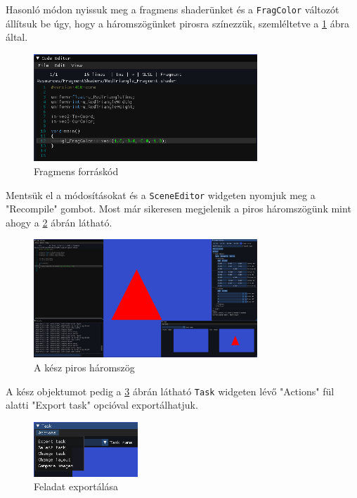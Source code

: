 Hasonló módon nyissuk meg a fragmens shaderünket és a \verb|FragColor| változót állítsuk be úgy, hogy a háromszögünket pirosra színezzük, szemléltetve a \ref{fig:fragment} ábra által. 

\begin{figure}[hbt!]
    \centering
    \includegraphics[width=0.75\textwidth,height=\textheight/2,keepaspectratio]
    {resources/Showcase/slimshady_fragment.png}
    \caption{Fragmens forráskód}
    \label{fig:fragment}
\end{figure}

Mentsük el a módosításokat és a \verb|SceneEditor| widgeten nyomjuk meg a "Recompile" gombot. Most már sikeresen megjelenik a piros háromszögünk mint ahogy a \ref{fig:red_triangle} ábrán látható.

\begin{figure}[hbt!]
    \centering
    \includegraphics[width=0.75\textwidth,height=\textheight/2,keepaspectratio]
    {resources/Showcase/slimshady_renderedTriangle.png}
    \caption{A kész piros háromszög}
    \label{fig:red_triangle}
\end{figure}

A kész objektumot pedig a \ref{fig:task_export} ábrán látható \verb"Task" widgeten lévő "Actions" fül alatti "Export task" opcióval exportálhatjuk.

\begin{figure}[hbt!]
    \centering
    \includegraphics[width=0.35\textwidth,height=\textheight/2,keepaspectratio]
    {resources/Showcase/slimshady_export.png}
    \caption{Feladat exportálása}
    \label{fig:task_export}
\end{figure}


